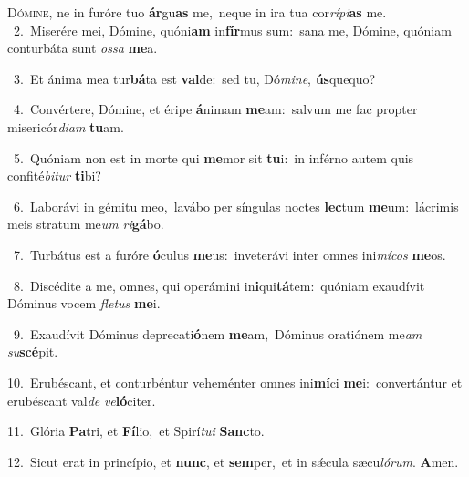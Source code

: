 \lettrine{\initial\textcolor{\initialcolor}{D}}{ómine,} ne in furóre tuo \textbf{ár}\-gu\textbf{as} me,~\star neque in ira tua cor\-\textit{rí}\-\textit{pi}\textbf{as} me.\\
{\numbfont\textcolor{\numbcolor}{~2.}}~Miserére mei, Dómine, quóni\textbf{am} in\-\textbf{fír}\-mus sum:~\star sana me, Dómine, quóniam conturbáta sunt \textit{os}\-\textit{sa} \textbf{me}\-a.\par
{\numbfont\textcolor{\numbcolor}{~3.}}~Et ánima mea tur\-\textbf{bá}\-ta est \textbf{val}\-de:~\star sed tu, Dó\-\textit{mi}\-\textit{ne}, \textbf{ús}\-quequo?\par
{\numbfont\textcolor{\numbcolor}{~4.}}~Convértere, Dómine, et éripe \textbf{á}\-nimam \textbf{me}\-am:~\star salvum me fac propter misericór\-\textit{di}\-\textit{am} \textbf{tu}\-am.\par
{\numbfont\textcolor{\numbcolor}{~5.}}~Quóniam non est in morte qui \textbf{me}\-mor sit \textbf{tu}\-i:~\star in inférno autem quis confité\-\textit{bi}\-\textit{tur} \textbf{ti}\-bi?\par
{\numbfont\textcolor{\numbcolor}{~6.}}~Laborávi in gémitu meo,~\dagger lavábo per síngulas noctes \textbf{lec}\-tum \textbf{me}\-um:~\star lácrimis meis stratum me\textit{um} \textit{ri}\-\textbf{gá}bo.\par
{\numbfont\textcolor{\numbcolor}{~7.}}~Turbátus est a furóre \textbf{ó}\-culus \textbf{me}\-us:~\star inveterávi inter omnes ini\-\textit{mí}\-\textit{cos} \textbf{me}\-os.\par
{\numbfont\textcolor{\numbcolor}{~8.}}~Discédite a me, omnes, qui operámini in\-\textbf{i}\-qui\-\textbf{tá}\-tem:~\star quóniam exaudívit Dóminus vocem \textit{fle}\-\textit{tus} \textbf{me}\-i.\par
{\numbfont\textcolor{\numbcolor}{~9.}}~Exaudívit Dóminus deprecati\-\textbf{ó}\-nem \textbf{me}\-am,~\star Dóminus oratiónem me\textit{am} \textit{su}\-\textbf{scé}pit.\par
{\numbfont\textcolor{\numbcolor}{10.}}~Erubéscant, et conturbéntur veheménter omnes ini\-\textbf{mí}\-ci \textbf{me}\-i:~\star convertántur et erubéscant val\textit{de} \textit{ve}\-\textbf{ló}citer.\par
{\numbfont\textcolor{\numbcolor}{11.}}~Glória \textbf{Pa}\-tri, et \textbf{Fí}\-lio,~\star et Spirí\-\textit{tu}\-\textit{i} \textbf{Sanc}\-to.\par
{\numbfont\textcolor{\numbcolor}{12.}}~Sicut erat in princípio, et \textbf{nunc}\-, et \textbf{sem}\-per,~\star et in sǽcula sæcu\-\textit{ló}\-\textit{rum}. \textbf{A}\-men.\par
